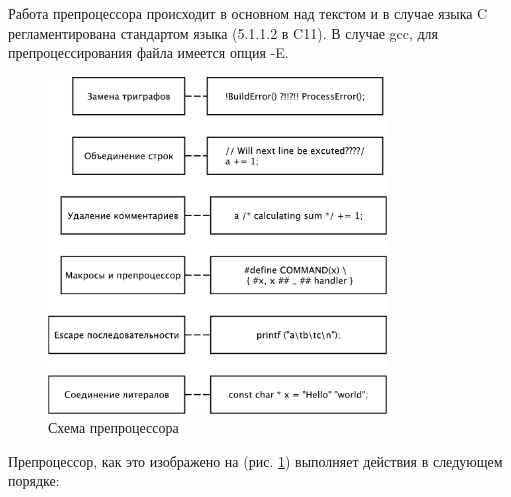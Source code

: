 \documentclass[a4paper,12pt,oneside]{article}
\begin{document}
Работа препроцессора происходит в основном над текстом и в случае языка C регламентирована стандартом языка (5.1.1.2 в C11). В случае gcc, для препроцессирования файла имеется опция -E.

\begin{figure}[ht]
\centering
\includegraphics[width=0.8\textwidth]{illustrations/preprocessor-scheme-crop.pdf}
\caption{Схема препроцессора}
\label{fig:preproc_scheme}
\end{figure}

Препроцессор, как это изображено на (рис. \ref{fig:preproc_scheme}) выполняет действия в следующем порядке:
\end{document}
